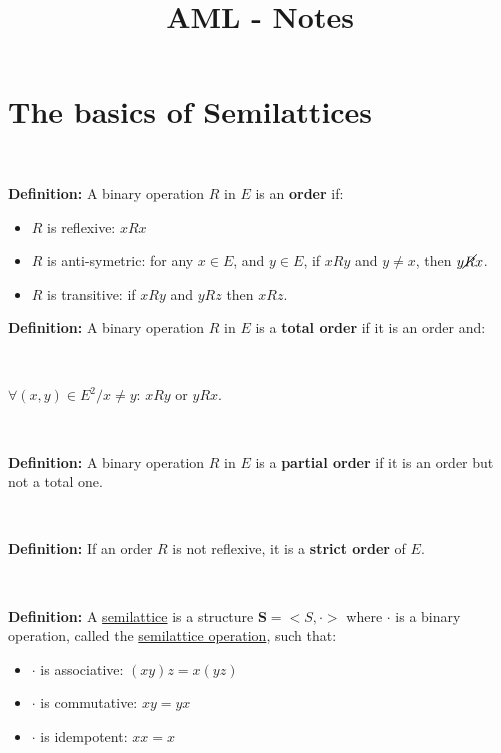 \documentclass[a4paper, 11pt]{article}
\title{AML - Notes}
\begin{document}
\maketitle

\section{The basics of Semilattices}

\

\begin{tcolorbox}
    \textbf{Definition:} A binary operation $R$ in $E$ is an \textbf{order} if:
    
    \begin{itemize}
        \item $R$ is reflexive: $xRx$
        \item $R$ is anti-symetric: for any $x \in E$, and $y \in E$, if $xRy$ and $y \neq x$, then $y\cancel{R}x$.
        \item $R$ is transitive: if $xRy$ and $yRz$ then $xRz$.
    \end{itemize}
    
    \textbf{Definition:} A binary operation $R$ in $E$ is a \textbf{total order} if it is an order and:
    
    \
    
    $\forall (x,y) \in E^2 / x \neq y$: $xRy$ or $yRx$.
    
    \
    
    \textbf{Definition:} A binary operation $R$ in $E$ is a \textbf{partial order} if it is an order but not a total one.
    
    \
    
    \textbf{Definition:} If an order $R$ is not reflexive, it is a \textbf{strict order} of $E$.
    
\end{tcolorbox}

\

\begin{tcolorbox}
    \textbf{Definition:} A \underline{semilattice} is a structure $\boldsymbol{S} = <S,\cdot>$ where $\cdot$ is a binary operation, called the \underline{semilattice operation}, such that:
    
    \begin{itemize}
        \item $\cdot$ is associative: $(xy)z = x(yz)$
        \item $\cdot$ is commutative: $xy = yx$
        \item $\cdot$ is idempotent: $xx=x$
    \end{itemize}
    
\end{tcolorbox}
\end{document}
